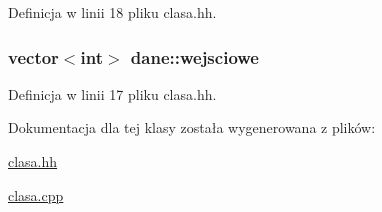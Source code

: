 \-Definicja w linii 18 pliku clasa.\-hh.

\hypertarget{classdane_a54607ce56b0cf755637110b0b81f5dde}{
\subsubsection[{wejsciowe}]{\setlength{\rightskip}{0pt plus 5cm}vector$<$int$>$ {\bf dane\-::wejsciowe}}}\label{classdane_a54607ce56b0cf755637110b0b81f5dde}


\-Definicja w linii 17 pliku clasa.\-hh.



\-Dokumentacja dla tej klasy została wygenerowana z plików\-:\begin{DoxyCompactItemize}
\item 
\hyperlink{clasa_8hh}{clasa.\-hh}\item 
\hyperlink{clasa_8cpp}{clasa.\-cpp}\end{DoxyCompactItemize}
